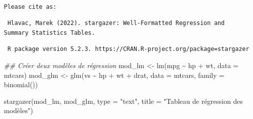 \documentclass[
  letterpaper,
  DIV=11,
  numbers=noendperiod]{scrreprt}
\newenvironment{Shaded}{\begin{snugshade}}{\end{snugshade}}
\newcommand{\AttributeTok}[1]{\textcolor[rgb]{0.40,0.45,0.13}{#1}}
\newcommand{\DocumentationTok}[1]{\textcolor[rgb]{0.37,0.37,0.37}{\textit{#1}}}
\newcommand{\FunctionTok}[1]{\textcolor[rgb]{0.28,0.35,0.67}{#1}}
\newcommand{\NormalTok}[1]{\textcolor[rgb]{0.00,0.23,0.31}{#1}}
\newcommand{\OtherTok}[1]{\textcolor[rgb]{0.00,0.23,0.31}{#1}}
\newcommand{\SpecialCharTok}[1]{\textcolor[rgb]{0.37,0.37,0.37}{#1}}
\newcommand{\StringTok}[1]{\textcolor[rgb]{0.13,0.47,0.30}{#1}}
\begin{document}
\begin{verbatim}

Please cite as: 
\end{verbatim}

\begin{verbatim}
 Hlavac, Marek (2022). stargazer: Well-Formatted Regression and Summary Statistics Tables.
\end{verbatim}

\begin{verbatim}
 R package version 5.2.3. https://CRAN.R-project.org/package=stargazer 
\end{verbatim}

\begin{Shaded}
\begin{Highlighting}[]
\DocumentationTok{\#\# Créer deux modèles de régression}
\NormalTok{mod\_lm }\OtherTok{\textless{}{-}} \FunctionTok{lm}\NormalTok{(mpg }\SpecialCharTok{\textasciitilde{}}\NormalTok{ hp }\SpecialCharTok{+}\NormalTok{ wt, }\AttributeTok{data =}\NormalTok{ mtcars)}
\NormalTok{mod\_glm }\OtherTok{\textless{}{-}} \FunctionTok{glm}\NormalTok{(vs }\SpecialCharTok{\textasciitilde{}}\NormalTok{ hp }\SpecialCharTok{+}\NormalTok{ wt }\SpecialCharTok{+}\NormalTok{ drat, }\AttributeTok{data =}\NormalTok{ mtcars, }\AttributeTok{family =} \FunctionTok{binomial}\NormalTok{())}

\FunctionTok{stargazer}\NormalTok{(mod\_lm, mod\_glm, }\AttributeTok{type =} \StringTok{"text"}\NormalTok{, }\AttributeTok{title =} \StringTok{"Tableau de régression des modèles"}\NormalTok{)}
\end{Highlighting}
\end{Shaded}
\end{document}
